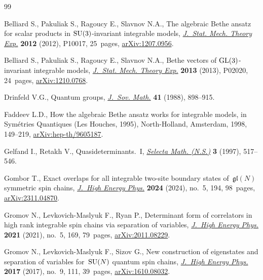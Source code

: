 \begin{thebibliography}{99}
\footnotesize\itemsep=0pt

Belliard S., Pakuliak S., Ragoucy E., Slavnov N.A., The algebraic {B}ethe
 ansatz for scalar products in {${\rm SU}(3)$}-invariant integrable models,
 \href{https://doi.org/10.1088/1742-5468/2012/10/p10017}{\textit{J.~Stat.
 Mech. Theory Exp.}} \textbf{2012} (2012), P10017, 25~pages,
 \href{http://arxiv.org/abs/1207.0956}{arXiv:1207.0956}.

Belliard S., Pakuliak S., Ragoucy E., Slavnov N.A., Bethe vectors of {${\rm
 GL}(3)$}-invariant integrable models,
 \href{https://doi.org/10.1088/1742-5468/2013/02/p02020}{\textit{J.~Stat.
 Mech. Theory Exp.}} \textbf{2013} (2013), P02020, 24~pages,
 \href{http://arxiv.org/abs/1210.0768}{arXiv:1210.0768}.

Drinfeld V.G., Quantum groups,
 \href{https://doi.org/10.1007/BF01247086}{\textit{J.~Sov. Math.}} \textbf{41}
 (1988), 898--915.

Faddeev L.D., How the algebraic {B}ethe ansatz works for integrable models, in
 Sym\'{e}tries {Q}uantiques ({L}es {H}ouches, 1995), North-Holland, Amsterdam,
 1998, 149--219,
 \href{http://arxiv.org/abs/hep-th/9605187}{arXiv:hep-th/9605187}.

Gelfand I., Retakh V., Quasideterminants.~{I},
 \href{https://doi.org/10.1007/s000290050019}{\textit{Selecta Math. (N.S.)}}
 \textbf{3} (1997), 517--546.

Gombor T., Exact overlaps for all integrable two-site boundary states
 of~{$\mathfrak{gl}(N)$} symmetric spin chains,
 \href{https://doi.org/10.1007/jhep05(2024)194}{\textit{J.~High Energy Phys.}}
 \textbf{2024} (2024), no.~5, 194, 98~pages,
 \href{http://arxiv.org/abs/2311.04870}{arXiv:2311.04870}.

Gromov N., Levkovich-Maslyuk F., Ryan P., Determinant form of correlators in
 high rank integrable spin chains via separation of variables,
 \href{https://doi.org/10.1007/jhep05(2021)169}{\textit{J.~High Energy Phys.}}
 \textbf{2021} (2021), no.~5, 169, 79~pages,
 \href{http://arxiv.org/abs/2011.08229}{arXiv:2011.08229}.

Gromov N., Levkovich-Maslyuk F., Sizov G., New construction of eigenstates and
 separation of variables for~{${\rm SU}(N)$} quantum spin chains,
 \href{https://doi.org/10.1007/jhep09(2017)111}{\textit{J.~High Energy Phys.}}
 \textbf{2017} (2017), no.~9, 111, 39~pages,
 \href{http://arxiv.org/abs/1610.08032}{arXiv:1610.08032}.


\end{thebibliography}
